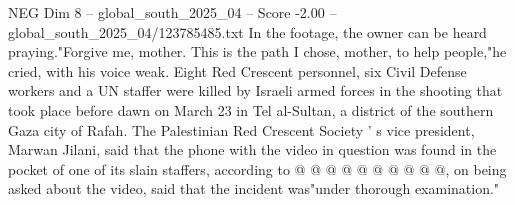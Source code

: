\begin{textsample}{NEG Dim 8 – global\_south\_2025\_04 – Score -2.00 – global\_south\_2025\_04/123785485.txt}
In the footage, the owner can be heard praying."Forgive me, mother.
This is the path I chose, mother, to help people,"he cried, with his voice weak.
Eight Red Crescent personnel, six Civil Defense workers and a UN staffer were killed by Israeli armed forces in the shooting that took place before dawn on March 23 in Tel al-Sultan, a district of the southern Gaza city of Rafah.
The Palestinian Red Crescent Society ' s vice president, Marwan Jilani, said that the phone with the video in question was found in the pocket of one of its slain staffers, according to @ @ @ @ @ @ @ @ @ @, on being asked about the video, said that the incident was"under thorough examination."

\end{textsample}
